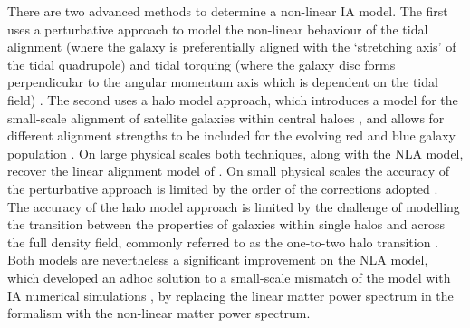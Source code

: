 \begin{appendix}
There are two advanced methods to determine a non-linear IA model.    The first uses a perturbative approach to model the non-linear behaviour of the tidal alignment (where the galaxy is preferentially aligned with the `stretching axis' of the tidal quadrupole) and tidal torquing (where the galaxy disc forms perpendicular to the angular momentum axis which is dependent on the tidal field) \citep{blazek/etal:2019, vlah/etal:2020}.  The second uses a halo model approach, which introduces a model for the small-scale alignment of satellite galaxies within central haloes \citep{schneider/bridle:2010}, and allows for different alignment strengths to be included for the evolving red and blue galaxy population \citep{fortuna/etal:2020}.  On large physical scales both techniques, along with the NLA model, recover the linear alignment model of \citet{hirata/seljak:2004}.  On small physical scales the accuracy of the perturbative approach is limited by the order of the corrections adopted \citep{blas/etal:2013}.  The accuracy of the halo model approach is limited by the challenge of modelling the transition between the properties of galaxies within single halos and across the full density field, commonly referred to as the one-to-two halo transition \citep[see for example the discussion in][]{mead/etal:2020b}.   Both models are nevertheless a significant improvement on the NLA model, which developed an adhoc solution to a small-scale mismatch of the \citet{hirata/seljak:2004} model with IA numerical simulations \citep{heymans/etal:2004}, by replacing the linear matter power spectrum in the \citet{hirata/seljak:2004} formalism with the non-linear matter power spectrum.


\end{appendix}

